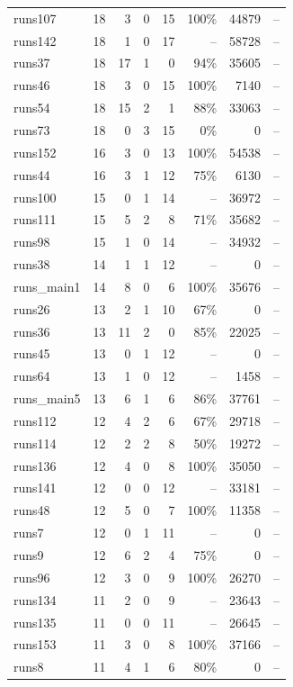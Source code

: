 \begin{longtable}{@{}lrrrrrrl@{}}
runs107 & 18 & 3 & 0 & 15 & 100\% & 44879 & -- \\
runs142 & 18 & 1 & 0 & 17 & -- & 58728 & -- \\
runs37 & 18 & 17 & 1 & 0 & 94\% & 35605 & -- \\
runs46 & 18 & 3 & 0 & 15 & 100\% & 7140 & -- \\
runs54 & 18 & 15 & 2 & 1 & 88\% & 33063 & -- \\
runs73 & 18 & 0 & 3 & 15 & 0\% & 0 & -- \\
runs152 & 16 & 3 & 0 & 13 & 100\% & 54538 & -- \\
runs44 & 16 & 3 & 1 & 12 & 75\% & 6130 & -- \\
runs100 & 15 & 0 & 1 & 14 & -- & 36972 & -- \\
runs111 & 15 & 5 & 2 & 8 & 71\% & 35682 & -- \\
runs98 & 15 & 1 & 0 & 14 & -- & 34932 & -- \\
runs38 & 14 & 1 & 1 & 12 & -- & 0 & -- \\
runs\_main1 & 14 & 8 & 0 & 6 & 100\% & 35676 & -- \\
runs26 & 13 & 2 & 1 & 10 & 67\% & 0 & -- \\
runs36 & 13 & 11 & 2 & 0 & 85\% & 22025 & -- \\
runs45 & 13 & 0 & 1 & 12 & -- & 0 & -- \\
runs64 & 13 & 1 & 0 & 12 & -- & 1458 & -- \\
runs\_main5 & 13 & 6 & 1 & 6 & 86\% & 37761 & -- \\
runs112 & 12 & 4 & 2 & 6 & 67\% & 29718 & -- \\
runs114 & 12 & 2 & 2 & 8 & 50\% & 19272 & -- \\
runs136 & 12 & 4 & 0 & 8 & 100\% & 35050 & -- \\
runs141 & 12 & 0 & 0 & 12 & -- & 33181 & -- \\
runs48 & 12 & 5 & 0 & 7 & 100\% & 11358 & -- \\
runs7 & 12 & 0 & 1 & 11 & -- & 0 & -- \\
runs9 & 12 & 6 & 2 & 4 & 75\% & 0 & -- \\
runs96 & 12 & 3 & 0 & 9 & 100\% & 26270 & -- \\
runs134 & 11 & 2 & 0 & 9 & -- & 23643 & -- \\
runs135 & 11 & 0 & 0 & 11 & -- & 26645 & -- \\
runs153 & 11 & 3 & 0 & 8 & 100\% & 37166 & -- \\
runs8 & 11 & 4 & 1 & 6 & 80\% & 0 & -- \\

\end{longtable}
